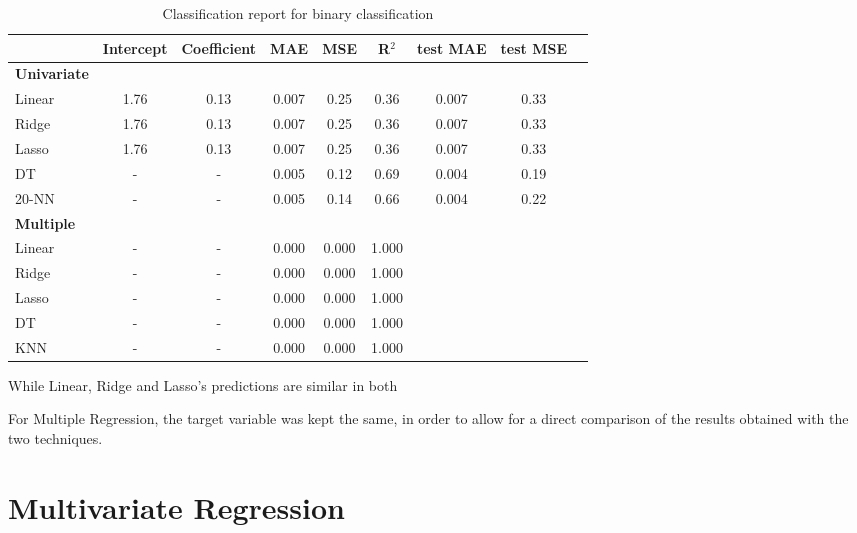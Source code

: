 \begin{table}[H]
    \centering
    \begin{tabular}{lcccccccc}
        \toprule
         & \textbf{Intercept} & \textbf{Coefficient} & \textbf{MAE} & \textbf{MSE} & \textbf{R$^2$} & \textbf{test MAE} & \textbf{test MSE} \\
        \midrule
        \textbf{Univariate} & & & & & \\
        \midrule
        Linear & 1.76 & 0.13 & 0.007 & 0.25 & 0.36 & 0.007 & 0.33 \\
        Ridge & 1.76 & 0.13 & 0.007 & 0.25 & 0.36 & 0.007 & 0.33 \\
        Lasso & 1.76 & 0.13 & 0.007 & 0.25 & 0.36 & 0.007 & 0.33 \\
        DT & - & - & 0.005 & 0.12 & 0.69 & 0.004 & 0.19 \\
        20-NN & - & - & 0.005 & 0.14 & 0.66 & 0.004 & 0.22 \\
        \midrule
        \textbf{Multiple} & & & & & \\
        \midrule
        Linear & - & - & 0.000 & 0.000 & 1.000 \\
        Ridge & - & - & 0.000 & 0.000 & 1.000 \\
        Lasso & - & - & 0.000 & 0.000 & 1.000 \\
        DT & - & - & 0.000 & 0.000 & 1.000 \\
        KNN & - & - & 0.000 & 0.000 & 1.000 \\
        \bottomrule
    \end{tabular}
    \caption{Classification report for binary classification}
    \label{tab:binary_classification_report}
\end{table}
While Linear, Ridge and Lasso's predictions are similar in both 

For Multiple Regression, the target variable was kept the same, in order to
allow for a direct comparison of the results obtained with the two techniques.


\section{Multivariate Regression}
